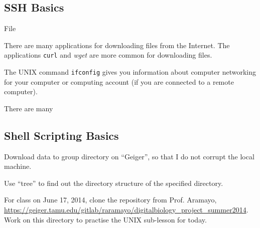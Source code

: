 \subsection{SSH Basics}
\label{ssec:SSHBasics}

File 






There are many applications for downloading files from the Internet. The applications {\tt curl} and {\it wget} are more common for downloading files.

The UNIX command {\tt ifconfig} gives you information about computer networking for your computer or computing account (if you are connected to a remote computer).


There are many 



\subsection{Shell Scripting Basics}
\label{ssec:ShellScriptingBasics}

Download data to group directory on ``Geiger'', so that I do not corrupt the local machine.

Use ``tree'' to find out the directory structure of the specified directory. 

For class on June 17, 2014, clone the repository from Prof. Aramayo, \url{https://geiger.tamu.edu/gitlab/raramayo/digitalbiology_project_summer2014}. Work on this directory to practise the UNIX sub-lesson for today.



































